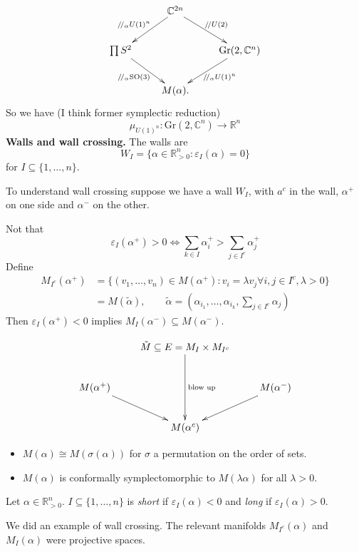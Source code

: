 $$
\xymatrix{
&\mathbb{C}^{2n}\ar[dl]_{/\!/_\alpha U(1)^n}
\ar[dr]^{/\!/U(2)}\\
\prod S^2 \ar[dr]_{/\!/_\alpha \text{SO}(3)}
 &  &
 \text{Gr}(2,\mathbb{C}^n)\ar[dl]^{/\!/
 _\alpha
 U(1)^n}\\
&M(\alpha).
}
$$
So we have (I think former symplectic
reduction)
$$
\mu_{U(1)^n}:\text{Gr}(2,\mathbb{C}^n)\to
\mathbb{R}^n
$$
\medskip\noindent
{\bf Walls and wall crossing.}
The walls are
$$
W_I=\{\alpha \in
\mathbb{R}^n_{>0}:\varepsilon_I(\alpha)=0\}
$$
for $I \subseteq \{1,\ldots,n\}$.

To understand wall crossing suppose we have
a wall $W_I$, with $a^c$ in the wall,
$\alpha^+$ on one side and $\alpha^-$ on the
other.

Not that
$$
\varepsilon_I(\alpha^+)>0 \iff
\sum_{k \in I}\alpha_i^+>
\sum_{ j \in I^c}\alpha_j^+
$$
Define
$$
\begin{aligned}
M_{I^c}(\alpha^+)
&=\{(v_1,\ldots,v_n) \in M(\alpha^+):
v_i=\lambda v_j \forall i,j \in I^c,
\lambda>0\}\\
&=M(\tilde{\alpha}),\qquad \tilde{\alpha}=
\left(\alpha_{i_1},\ldots,\alpha_{i_k},
\sum_{j
\in I^c}\alpha_j\right)
\end{aligned}
$$
Then $\varepsilon_I(\alpha^+)<0$
implies $M_I(\alpha^-) \subseteq
M(\alpha^-)$.

$$
\xymatrix{
&\tilde{M} \subseteq E=M_I \times
M_{I^c}\ar[dd]^{\text{blow up}}\\
M(\alpha^+)\ar[dr]&  &  M(\alpha^-)\ar[dl]\\
&M(\alpha^c)
}
$$
\begin{remark}
\label{remark-modul-space-polyg-propo}
\begin{itemize}
\item $M(\alpha)\cong M(\sigma(\alpha))$
for $\sigma$ a permutation on the order of
sets.
\item $M(\alpha)$ is conformally
symplectomorphic
to $M(\lambda \alpha)$ for all $\lambda>0$.
\end{itemize}
\end{remark}

\begin{definition}
\label{definition-short-and-long}
Let $\alpha \in \mathbb{R}^n_{>0}$.
$I \subseteq \{1,\ldots,n\}$ is {\it short}
if $\varepsilon_I(\alpha)<0$ and {\it long}
if  $\varepsilon_I(\alpha)>0$.
\end{definition}

\begin{example}
\label{example-wall-crossing}
We did an example of wall crossing.
The relevant manifolds $M_{I^c}(\alpha)$ and
$M_I(\alpha)$
were projective spaces.
\end{example}

